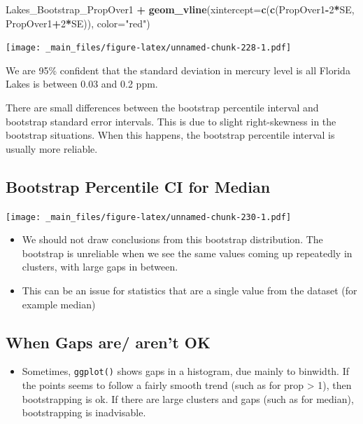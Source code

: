 \documentclass[]{book}
\newenvironment{Shaded}{\begin{snugshade}}{\end{snugshade}}
\newcommand{\KeywordTok}[1]{\textcolor[rgb]{0.13,0.29,0.53}{\textbf{#1}}}
\newcommand{\DataTypeTok}[1]{\textcolor[rgb]{0.13,0.29,0.53}{#1}}
\newcommand{\DecValTok}[1]{\textcolor[rgb]{0.00,0.00,0.81}{#1}}
\newcommand{\StringTok}[1]{\textcolor[rgb]{0.31,0.60,0.02}{#1}}
\newcommand{\OperatorTok}[1]{\textcolor[rgb]{0.81,0.36,0.00}{\textbf{#1}}}
\newcommand{\NormalTok}[1]{#1}
\providecommand{\tightlist}{%
  \setlength{\itemsep}{0pt}\setlength{\parskip}{0pt}}
\begin{document}
\begin{Shaded}
\begin{Highlighting}[]
\NormalTok{Lakes_Bootstrap_PropOver1  }\OperatorTok{+}\StringTok{ }\KeywordTok{geom_vline}\NormalTok{(}\DataTypeTok{xintercept=}\KeywordTok{c}\NormalTok{(}\KeywordTok{c}\NormalTok{(PropOver1}\OperatorTok{-}\DecValTok{2}\OperatorTok{*}\NormalTok{SE, PropOver1}\OperatorTok{+}\DecValTok{2}\OperatorTok{*}\NormalTok{SE)), }\DataTypeTok{color=}\StringTok{"red"}\NormalTok{) }
\end{Highlighting}
\end{Shaded}

\texttt{[image: \_main\_files/figure-latex/unnamed-chunk-228-1.pdf]}

We are 95\% confident that the standard deviation in mercury level is
all Florida Lakes is between 0.03 and 0.2 ppm.

There are small differences between the bootstrap percentile interval
and bootstrap standard error intervals. This is due to slight
right-skewness in the bootstrap situations. When this happens, the
bootstrap percentile interval is usually more reliable.

\subsection{Bootstrap Percentile CI for
Median}\label{bootstrap-percentile-ci-for-median}

\texttt{[image: \_main\_files/figure-latex/unnamed-chunk-230-1.pdf]}

\begin{itemize}
\item
  We should not draw conclusions from this bootstrap distribution. The
  bootstrap is unreliable when we see the same values coming up
  repeatedly in clusters, with large gaps in between.
\item
  This can be an issue for statistics that are a single value from the
  dataset (for example median)
\end{itemize}

\subsection{When Gaps are/ aren't OK}\label{when-gaps-are-arent-ok}

\begin{itemize}
\tightlist
\item
  Sometimes, \texttt{ggplot()} shows gaps in a histogram, due mainly to
  binwidth. If the points seems to follow a fairly smooth trend (such as
  for prop \textgreater{} 1), then bootstrapping is ok. If there are
  large clusters and gaps (such as for median), bootstrapping is
  inadvisable.
\end{itemize}
\end{document}
